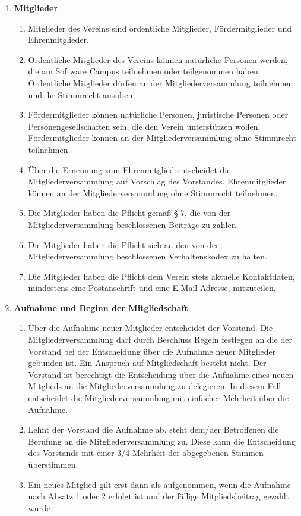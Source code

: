 \documentclass{article}
\begin{document}
\begin{enumerate}[§ 1.]
\item \textsf{\textbf{Mitglieder}}
	\begin{enumerate}[1.]
	\item Mitglieder des Vereins sind ordentliche Mitglieder, Fördermitglieder und
Ehrenmitglieder.
	\item Ordentliche Mitglieder des Vereins können natürliche Personen werden, die am
Software Campus teilnehmen oder teilgenommen haben.
Ordentliche Mitglieder
dürfen an der Mitgliederversammlung teilnehmen und ihr Stimmrecht ausüben.
	\item Fördermitglieder können natürliche Personen, juristische Personen oder
Personengesellschaften sein, die den Verein unterstützen wollen. Fördermitglieder
können an der Mitgliederversammlung ohne Stimmrecht teilnehmen.
	\item Über die Ernennung zum Ehrenmitglied entscheidet die Mitgliederversammlung auf Vorschlag des Vorstandes.
Ehrenmitglieder können an der Mitgliederversammlung ohne Stimmrecht teilnehmen.
	\item Die Mitglieder haben die Pflicht gemäß § 7, die von der Mitgliederversammlung
beschlossenen Beiträge zu zahlen.
	\item Die Mitglieder haben die Pflicht sich an den von der Mitgliederversammlung beschlossenen Verhaltenskodex zu halten.
	\item Die Mitglieder haben die Pflicht dem Verein stets aktuelle Kontaktdaten, mindestens eine Postanschrift und eine E-Mail Adresse, mitzuteilen. 
	\end{enumerate}

\item \textsf{\textbf{Aufnahme und Beginn der Mitgliedschaft}}
	\begin{enumerate}[1.]
	\item Über die Aufnahme neuer Mitglieder entscheidet der Vorstand.
	Die Mitgliederversammlung darf durch Beschluss Regeln festlegen an die der Vorstand bei der Entscheidung über die Aufnahme neuer Mitglieder gebunden ist.
	Ein Anspruch auf Mitgliedschaft besteht nicht.
	Der Vorstand ist berechtigt die Entscheidung über die Aufnahme eines neuen Mitglieds an die Mitgliederversammlung zu delegieren.
	In diesem Fall entscheidet die Mitgliederversammlung mit einfacher Mehrheit über die Aufnahme.
	\item Lehnt der Vorstand die Aufnahme ab, steht dem/der Betroffenen die Berufung an die Mitgliederversammlung zu.
	Diese kann die Entscheidung des Vorstands mit einer 3/4-Mehrheit der abgegebenen Stimmen überstimmen.
	\item Ein neues Mitglied gilt erst dann als aufgenommen, wenn die Aufnahme nach Absatz 1 oder 2 erfolgt ist und der fällige Mitgliedsbeitrag gezahlt wurde.
	\end{enumerate}


\end{enumerate}
\end{document}
